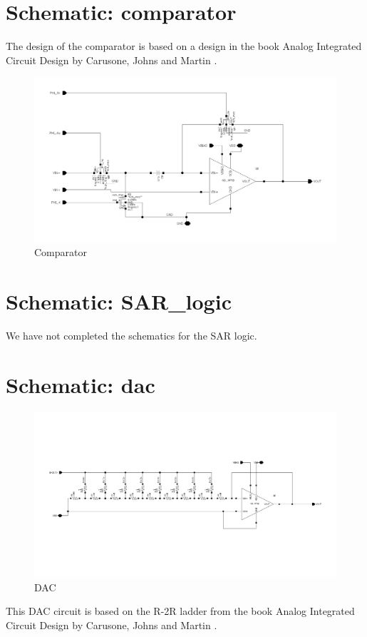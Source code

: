 \documentclass[english, a4paper,11pt]{article}
\begin{document}
\section*{Schematic: comparator}
The design of the comparator is based on a design in the book Analog Integrated Circuit Design by Carusone, Johns and Martin \cite{Analog-integrated}. 
\begin{figure}[!ht]
 \centering
   \includegraphics[width=\textwidth]{img/comparator}
   \caption{Comparator}
   \label{comparator}
\end{figure}


\section*{Schematic: SAR\_logic}
We have not completed the schematics for the SAR logic.

\section*{Schematic: dac}
\begin{figure}[!ht]
 \centering
   \includegraphics[width=\textwidth]{img/dac}
   \caption{DAC}
   \label{dac}
\end{figure}
This DAC circuit is based on the R-2R ladder from the book Analog Integrated Circuit Design by Carusone, Johns and Martin \cite{Analog-integrated}.
\end{document}

